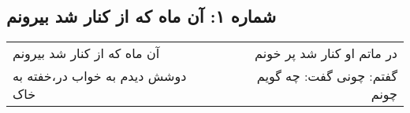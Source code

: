 \begin{center}
\section*{شماره ۱: آن ماه که از کنار شد بیرونم}
\label{sec:001}
\begin{longtable}{l p{0.5cm} r}
آن ماه که از کنار شد بیرونم
&&
در ماتم او کنار شد پر خونم
\\
دوشش دیدم به خواب در،‌خفته به خاک
&&
گفتم: چونی گفت: چه گویم چونم
\\
\end{longtable}
\end{center}
